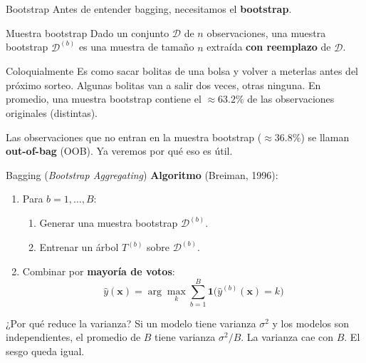 \documentclass[aspectratio=169]{beamer}
\newcommand{\bx}{\bm{x}}
\begin{document}
\begin{frame}{Bootstrap}
  Antes de entender bagging, necesitamos el \textbf{bootstrap}.

  \medskip
  \begin{block}{Muestra bootstrap}
    Dado un conjunto $\mathcal{D}$ de $n$ observaciones, una muestra bootstrap
    $\mathcal{D}^{(b)}$ es una muestra de tamaño $n$ extraída \textbf{con reemplazo} de $\mathcal{D}$.
  \end{block}

  \medskip
  \begin{exampleblock}{Coloquialmente}
    Es como sacar bolitas de una bolsa y volver a meterlas antes del próximo sorteo.
    Algunas bolitas van a salir dos veces, otras ninguna.
    En promedio, una muestra bootstrap contiene el $\approx 63.2\%$ de las observaciones originales (distintas).
  \end{exampleblock}

  \medskip
  Las observaciones que no entran en la muestra bootstrap ($\approx 36.8\%$)
  se llaman \textbf{out-of-bag} (OOB). Ya veremos por qué eso es útil.
\end{frame}

\begin{frame}{Bagging (\textit{Bootstrap Aggregating})}
  \textbf{Algoritmo} (Breiman, 1996):

  \medskip
  \begin{enumerate}
    \item Para $b = 1, \ldots, B$:
    \begin{enumerate}
      \item Generar una muestra bootstrap $\mathcal{D}^{(b)}$.
      \item Entrenar un árbol $T^{(b)}$ sobre $\mathcal{D}^{(b)}$.
    \end{enumerate}
    \item Combinar por \textbf{mayoría de votos}:
    \[
      \hat{y}(\bx) = \arg\max_k \sum_{b=1}^{B} \mathbf{1}\bigl(\hat{y}^{(b)}(\bx) = k\bigr)
    \]
  \end{enumerate}

  \medskip
  \begin{exampleblock}{¿Por qué reduce la varianza?}
    Si un modelo tiene varianza $\sigma^2$ y los modelos son independientes,
    el promedio de $B$ tiene varianza $\sigma^2/B$.
    La varianza cae con $B$. El sesgo queda igual.
  \end{exampleblock}
\end{frame}
\end{document}
